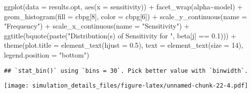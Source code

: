\documentclass[
]{article}
\newenvironment{Shaded}{\begin{snugshade}}{\end{snugshade}}
\newcommand{\AttributeTok}[1]{\textcolor[rgb]{0.77,0.63,0.00}{#1}}
\newcommand{\DecValTok}[1]{\textcolor[rgb]{0.00,0.00,0.81}{#1}}
\newcommand{\FloatTok}[1]{\textcolor[rgb]{0.00,0.00,0.81}{#1}}
\newcommand{\FunctionTok}[1]{\textcolor[rgb]{0.00,0.00,0.00}{#1}}
\newcommand{\NormalTok}[1]{#1}
\newcommand{\SpecialCharTok}[1]{\textcolor[rgb]{0.00,0.00,0.00}{#1}}
\newcommand{\StringTok}[1]{\textcolor[rgb]{0.31,0.60,0.02}{#1}}
\begin{document}
\begin{Shaded}
\begin{Highlighting}[]
\FunctionTok{ggplot}\NormalTok{(}\AttributeTok{data =}\NormalTok{ results.opt,}
       \FunctionTok{aes}\NormalTok{(}\AttributeTok{x =}\NormalTok{ sensitivity)) }\SpecialCharTok{+}
  \FunctionTok{facet\_wrap}\NormalTok{(alpha}\SpecialCharTok{\textasciitilde{}}\NormalTok{model) }\SpecialCharTok{+}
  \FunctionTok{geom\_histogram}\NormalTok{(}\AttributeTok{fill =}\NormalTok{ cbpg[}\DecValTok{8}\NormalTok{], }\AttributeTok{color =}\NormalTok{ cbpg[}\DecValTok{6}\NormalTok{]) }\SpecialCharTok{+}
  \FunctionTok{scale\_y\_continuous}\NormalTok{(}\AttributeTok{name =} \StringTok{"Frequency"}\NormalTok{) }\SpecialCharTok{+}
  \FunctionTok{scale\_x\_continuous}\NormalTok{(}\AttributeTok{name =} \StringTok{"Sensitivity"}\NormalTok{) }\SpecialCharTok{+}
  \FunctionTok{ggtitle}\NormalTok{(}\FunctionTok{bquote}\NormalTok{(}\FunctionTok{paste}\NormalTok{(}\StringTok{"Distribution(s) of Sensitivity for "}\NormalTok{, beta[j] }\SpecialCharTok{==} \FloatTok{0.1}\NormalTok{))) }\SpecialCharTok{+}
  \FunctionTok{theme}\NormalTok{(}\AttributeTok{plot.title =} \FunctionTok{element\_text}\NormalTok{(}\AttributeTok{hjust =} \FloatTok{0.5}\NormalTok{), }
        \AttributeTok{text =} \FunctionTok{element\_text}\NormalTok{(}\AttributeTok{size =} \DecValTok{14}\NormalTok{),}
        \AttributeTok{legend.position =} \StringTok{"bottom"}\NormalTok{)}
\end{Highlighting}
\end{Shaded}

\begin{verbatim}
## `stat_bin()` using `bins = 30`. Pick better value with `binwidth`.
\end{verbatim}

\texttt{[image: simulation\_details\_files/figure-latex/unnamed-chunk-22-4.pdf]}
\end{document}
